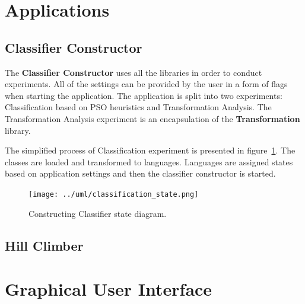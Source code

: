 \documentclass{mini}
\begin{document}
\section{Applications}

\subsection{Classifier Constructor}

The {\bf Classifier Constructor} uses all the libraries in order to conduct experiments. All of the settings can be provided by the user in a form of flags when starting the application. The application is split into two experiments: Classification based on PSO heuristics and Transformation Analysis. The Transformation Analysis experiment is an encapsulation of the {\bf Transformation} library.

The simplified process of Classification experiment is presented in figure~\ref{fig:classification_states}. The classes are loaded and transformed to languages. Languages are assigned states based on application settings and then the classifier constructor is started.

\begin{figure}[H]
    \centering
    \texttt{[image: ../uml/classification\_state.png]}
    \caption{Constructing Classifier state diagram.}
    \label{fig:classification_states}
\end{figure}


\subsection{Hill Climber}
\section{Graphical User Interface}
\end{document}
